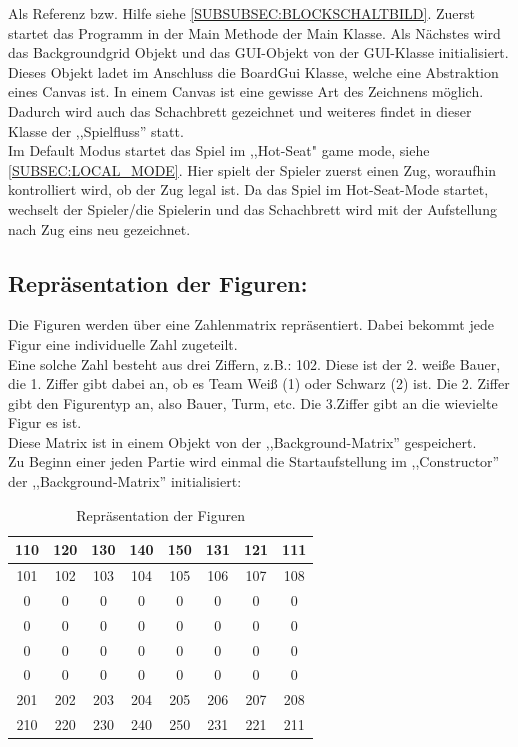 \documentclass[12pt,a4paper]{article}
\newcommand{\cmnt}[1]{}			%
\begin{document}
{\cmnt{Hier soll erklärt werden wie JavaChess initialisiert wird.}

Als Referenz bzw. Hilfe siehe \ref{SUBSUBSEC:BLOCKSCHALTBILD}.
Zuerst startet das Programm in der Main Methode der Main Klasse. Als Nächstes wird das Backgroundgrid Objekt und das GUI-Objekt von der GUI-Klasse initialisiert. \\
Dieses Objekt ladet im Anschluss die BoardGui Klasse, welche eine Abstraktion eines Canvas ist. In einem Canvas ist eine gewisse Art des Zeichnens möglich. Dadurch wird auch das Schachbrett gezeichnet und weiteres findet in dieser Klasse der ,,Spielfluss'' statt. \\ 
Im Default Modus startet das Spiel im ,,Hot-Seat" game mode, siehe \ref{SUBSEC:LOCAL_MODE}. Hier spielt der Spieler zuerst einen Zug, woraufhin kontrolliert wird, ob der Zug legal ist. Da das Spiel im Hot-Seat-Mode startet, wechselt der Spieler/die Spielerin und das Schachbrett wird mit der Aufstellung nach Zug eins neu gezeichnet.

\subsection{Repräsentation der Figuren:}

Die Figuren werden über eine Zahlenmatrix repräsentiert. Dabei bekommt jede Figur eine individuelle Zahl zugeteilt. \\
Eine solche Zahl besteht aus drei Ziffern, z.B.: 102. Diese ist der 2. weiße Bauer, die 1. Ziffer gibt dabei an, ob es Team Weiß (1) oder Schwarz (2) ist. Die 2. Ziffer gibt den Figurentyp an, also Bauer, Turm, etc. Die 3.Ziffer gibt an die wievielte Figur es ist. \\
Diese Matrix ist in einem Objekt von der ,,Background-Matrix'' gespeichert. \\
Zu Beginn einer jeden Partie wird einmal die Startaufstellung im ,,Constructor'' der ,,Background-Matrix'' initialisiert:

	\begin{table}[H]
		\centering
		\begin{tabular}{| c | c | c | c | c | c | c | c |}
			\hline
			110 & 120 	& 	130 & 140 	& 150 	& 131 	& 121 	& 	111 \\ \hline
			101 & 102 	& 	103 & 	104 & 	105 & 	106 & 	107 & 	108 \\ \hline
			0	&	0	& 	0	&	0	&	0	&	0	&	0	&	0	\\ \hline
			0	&	0	& 	0	&	0	&	0	&	0	&	0	&	0 	\\ \hline
			0	&	0	& 	0	&	0	&	0	&	0	&	0	&	0 	\\ \hline
			0	&	0	& 	0	&	0	&	0	&	0	&	0	&	0 	\\ \hline
			201 &	202 &	203	&	204	&	205	&	206	&	207	&	208	\\ \hline
			210 & 	220	&	230	&	240	&	250	&	231	&	221	&	211 \\ 
			\hline	
		\end{tabular}
		\caption{Repräsentation der Figuren}
		\label{TABLE:REPRESENTATION-MEEPLES}
	\end{table}

}
\end{document}
